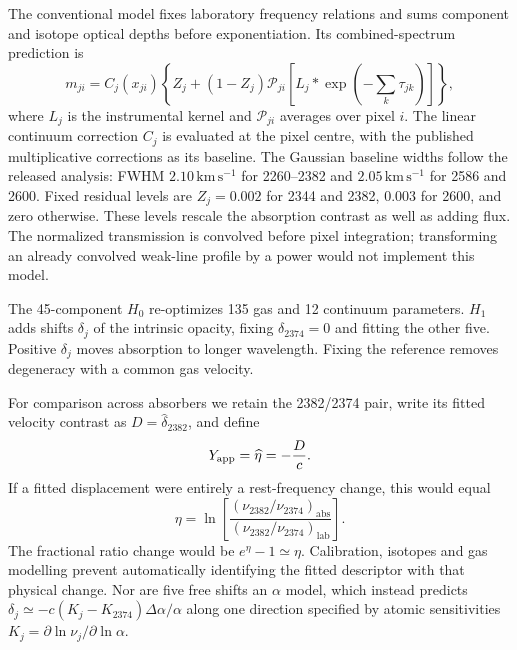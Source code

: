 The conventional model fixes laboratory frequency relations and sums component and isotope optical depths before exponentiation. Its combined-spectrum prediction is
\begin{equation}
 m_{ji}=C_j(x_{ji})\left\{Z_j+(1-Z_j)
 \mathcal{P}_{ji}\!\left[L_j*\exp\!\left(-\sum_k\tau_{jk}\right)\right]\right\},
 \label{eq:forward_model}
\end{equation}
where $L_j$ is the instrumental kernel and $\mathcal{P}_{ji}$ averages over pixel $i$. The linear continuum correction $C_j$ is evaluated at the pixel centre, with the published multiplicative corrections as its baseline. The Gaussian baseline widths follow the released analysis: FWHM $2.10\,\mathrm{km\,s^{-1}}$ for 2260--2382 and $2.05\,\mathrm{km\,s^{-1}}$ for 2586 and 2600. Fixed residual levels are $Z_j=0.002$ for 2344 and 2382, $0.003$ for 2600, and zero otherwise. These levels rescale the absorption contrast as well as adding flux. The normalized transmission is convolved before pixel integration; transforming an already convolved weak-line profile by a power would not implement this model.

The 45-component $H_0$ re-optimizes 135 gas and 12 continuum parameters. $H_1$ adds shifts $\delta_j$ of the intrinsic opacity, fixing $\delta_{2374}=0$ and fitting the other five. Positive $\delta_j$ moves absorption to longer wavelength. Fixing the reference removes degeneracy with a common gas velocity.

For comparison across absorbers we retain the 2382/2374 pair, write its fitted velocity contrast as $D=\widehat\delta_{2382}$, and define
\begin{equation}
 Y_{\rm app}=\widehat\eta=-\frac{D}{c}.
 \label{eq:eta}
\end{equation}
If a fitted displacement were entirely a rest-frequency change, this would equal
\begin{equation}
 \eta=\ln\!\left[\frac{(\nu_{2382}/\nu_{2374})_{
 \mathrm{abs}}}{(\nu_{2382}/\nu_{2374})_{\mathrm{lab}}}\right].
 \label{eq:frequency_ratio}
\end{equation}
The fractional ratio change would be $e^\eta-1\simeq\eta$. Calibration, isotopes and gas modelling prevent automatically identifying the fitted descriptor with that physical change. Nor are five free shifts an $\alpha$ model, which instead predicts $\delta_j\simeq-c(K_j-K_{2374})\Delta\alpha/\alpha$ along one direction specified by atomic sensitivities $K_j=\partial\ln\nu_j/\partial\ln\alpha$.

